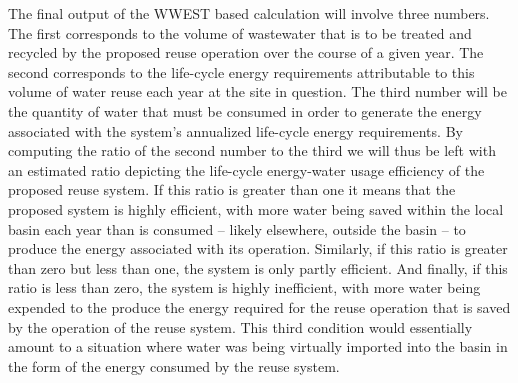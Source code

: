 The final output of the WWEST based calculation will involve three numbers. The first corresponds to the volume of wastewater that is to be treated and recycled by the proposed reuse operation over the course of a given year. The second corresponds to the life-cycle energy requirements attributable to this volume of water reuse each year at the site in question. The third number will be the quantity of water that must be consumed in order to generate the energy associated with the system's annualized life-cycle energy requirements. By computing the ratio of the second number to the third we will thus be left with an estimated ratio depicting the life-cycle energy-water usage efficiency of the proposed reuse system. If this ratio is greater than one it means that the proposed system is highly efficient, with more water being saved within the local basin each year than is consumed -- likely elsewhere, outside the basin -- to produce the energy associated with its operation. Similarly, if this ratio is greater than zero but less than one, the system is only partly efficient. And finally, if this ratio is less than zero, the system is highly inefficient, with more water being expended to the produce the energy required for the reuse operation that is saved by the operation of the reuse system. This third condition would essentially amount to a situation where water was being virtually imported into the basin in the form of the energy consumed by the reuse system.

\clearpage
